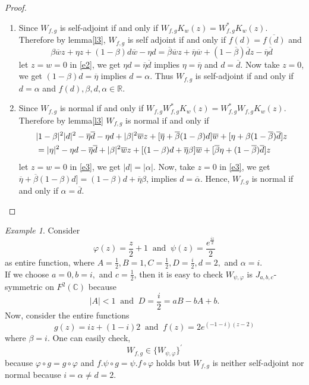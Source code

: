 \documentclass[reqno]{amsart}
\theoremstyle{remark}
\theoremstyle{Definition}
\theoremstyle{remark}
\newtheorem{ex}{Example}
\numberwithin{equation}{section}
\begin{document}
\begin{proof}
\begin{enumerate}
    \item Since $W_{f,g}$ is self-adjoint if and only if $W_{f,g}K_{w}(z)=W^{*}_{f,g}K_{w}(z)$. Therefore by lemma\ref{l3}, $W_{f,g}$ is self adjoint if and only if
$f(d)=\overline{f(d)}$ and 
\begin{equation}\label{e2}
\beta \overline{w}z+\eta z+(1-\beta)d \overline{w}-\eta d = \overline{\beta}\overline{w}z+\overline{\eta}\overline{w}+(1-\overline{\beta}) \overline{d}z- \overline{\eta}\overline{d}
\end{equation}
let $z=w=0$ in \eqref{e2}, we get $\eta d =\overline{\eta}\overline{d}$ implies $\eta=\overline{\eta}$ and $d= \overline{d}$. 
Now take $z=0$, we get 
    $(1-\beta)d =\overline{\eta}$ implies  $d=\alpha$.
Thus  $W_{f,g}$ is self-adjoint if and only if  $d= \alpha$ and $f(d),\beta,d,\alpha \in \mathbb{R}$.    

\item Since $W_{f,g}$ is normal if and only if $W_{f,g}W^{*}_{f,g}K_{w}(z)=W^{*}_{f,g}W_{f,g}K_{w}(z)$. Therefore by lemma\ref{l3} $W_{f,g}$ is normal if and only if 
\begin{align}\label{e3}
  &|1-\beta|^{2}|d|^{2}-\overline{\eta}\overline{d}-\eta d+|\beta|^{2}\overline{w}z+[\overline{\eta}+\overline{\beta}(1-\beta)d]\overline{w}+[ \eta +\beta(1-\overline{\beta})\overline{d}]z \notag \\
  &= |\eta|^{2}-\eta d-\overline{\eta}\overline{d}+|\beta|^{2}\overline{w}z+[(1-\beta)d+\overline{\eta}\beta]\overline{w}+[\overline{\beta} \eta +(1-\overline{\beta})\overline{d}]z
 \end{align}
let $z=w=0$ in \eqref{e3}, we get $|d|=|\alpha|$. 
 Now, take $z=0$ in \eqref{e3}, we get $\overline{\eta}+\overline{\beta}(1-\beta)d]= (1-\beta)d+\overline{\eta}\beta$, implies $d=\overline{\alpha}$.
Hence, $W_{f,g}$ is normal if and only if $\alpha=\overline{d}$.
\end{enumerate}
\end{proof}
\begin{ex}
   Consider $$\varphi(z)=\frac{z}{2}+1 ~\text{ and } ~\psi(z)= \frac{e^{\frac{iz}{2}}}{2}$$ as entire function, where $A=\frac{1}{2}, B=1, C= \frac{1}{2}, D= \frac{i}{2}, d= 2,$ and $ \alpha =i.$\\
   If we choose $a=0,b=i,$ and $c=\frac{1}{2}$, then it is easy to check $W_{\psi, \varphi}$ is $J_{a,b,c}$- symmetric on $F^{2}(\mathbb{C})$ because $$|A|<1~\text{ and }~ D=\frac{i}{2}= aB-bA+b.$$
   Now, consider the entire functions $$g(z)= iz+(1-i)2~ \text{ and }~ f(z)=2e^{(-1-i)(z-2)} $$ where $\beta=i$. One can easily check, 
   $$ W_{f,g}\in \{W_{\psi, \varphi}\}^{'}$$
   because $\varphi\circ g= g\circ \varphi$ and $f.\psi\circ g= \psi .f\circ \varphi$ holds but $ W_{f,g}$ is neither self-adjoint nor normal because $i=\alpha \neq d=2$.
\end{ex}
\end{document}
